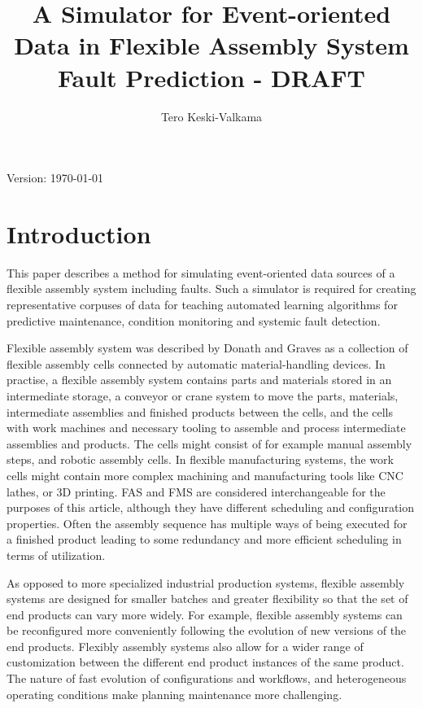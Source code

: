\documentclass[journal]{IEEEtran}
\title{A Simulator for Event-oriented Data in Flexible Assembly System Fault Prediction - DRAFT}
\author{Tero Keski-Valkama}
\begin{document}
\maketitle
Version: \today

\begin{abstract}

\end{abstract}

\begin{IEEEkeywords}
\end{IEEEkeywords}

\section{Introduction}
This paper describes a method for simulating event-oriented data sources of a flexible assembly system including faults. Such a simulator is required for creating representative corpuses
of data for teaching automated learning algorithms for predictive maintenance, condition monitoring and systemic fault detection.

Flexible assembly system was described by Donath and Graves \cite{donath1988flexible} as a collection of flexible assembly cells connected by automatic material-handling devices.
In practise, a flexible assembly system contains parts and materials stored in an intermediate storage,
a conveyor or crane system to move the parts, materials, intermediate assemblies and finished products between the cells, and the cells with work machines and necessary tooling
to assemble and process intermediate assemblies and products. The cells might consist of for example manual assembly steps, and robotic assembly cells. In flexible manufacturing systems,
the work cells might contain more complex machining and manufacturing tools like CNC lathes, or 3D printing. FAS and FMS are considered interchangeable for the purposes of this article, although
they have different scheduling and configuration properties.
Often the assembly sequence has multiple ways of being executed for a finished product leading to some redundancy and more efficient scheduling in terms of utilization.

As opposed to more specialized industrial production systems, flexible assembly systems are designed for smaller batches and greater flexibility so that the set of end products can vary more widely.
For example, flexible assembly systems can be reconfigured more conveniently following the evolution of new versions of the end products. Flexibly assembly systems also allow for a wider range
of customization between the different end product instances of the same product. The nature of fast evolution of configurations and workflows, and heterogeneous operating conditions make
planning maintenance more challenging.
\end{document}

